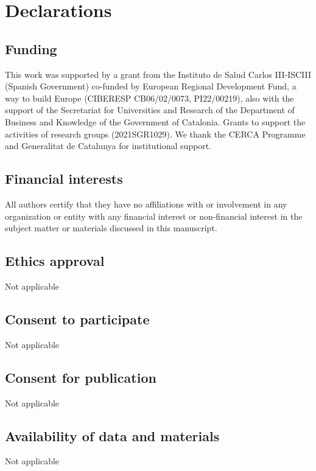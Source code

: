 \documentclass[sn-mathphys,Numbered]{sn-jnl}%
\begin{document}
\section*{Declarations}
\subsection*{Funding}
This work was supported by a grant from the Instituto de Salud Carlos III-ISCIII (Spanish Government) co-funded by European Regional Development Fund, a way to build Europe (CIBERESP CB06/02/0073, PI22/00219), also with the support of the Secretariat for Universities and Research of the Department of Business and Knowledge of the Government of Catalonia. Grants to support the activities of research groups (2021SGR1029). We thank the CERCA Programme and Generalitat de Catalunya for institutional support.
\subsection*{Financial interests}
All authors certify that they have no affiliations with or involvement in any organization or entity with any financial interest or non-financial interest in the subject matter or materials discussed in this manuscript.
\subsection*{Ethics approval}
Not applicable
\subsection*{Consent to participate}
Not applicable
\subsection*{Consent for publication}
Not applicable
\subsection*{Availability of data and materials}
Not applicable
\end{document}
